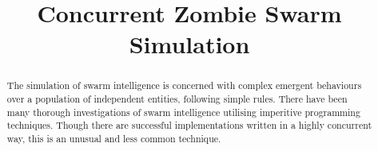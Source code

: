 \documentclass[10pt, a4paper, conference, compsocconf]{IEEEtran}
\begin{document}
\title{Concurrent Zombie Swarm Simulation}

\author{
\and
{}
\and
{}
}
\maketitle

\begin{abstract}
The simulation of swarm intelligence is concerned with complex emergent behaviours over a population of independent entities, following simple rules. There have been many thorough investigations of swarm intelligence utilising imperitive programming techniques. Though there are successful implementations written in a highly concurrent way, this is an unusual and less common technique.
\end{abstract}
\end{document}
